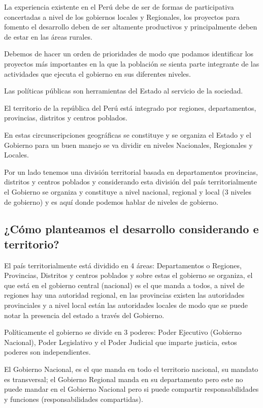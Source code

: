 \documentclass[
  jou,
  floatsintext,
  longtable,
  a4paper,
  nolmodern,
  notxfonts,
  notimes,
  12pt,
  colorlinks=true,linkcolor=blue,citecolor=blue,urlcolor=blue]{apa7}
\begin{document}
La experiencia existente en el Perú debe de ser de formas de
participativa concertadas a nivel de los gobiernos locales y Regionales,
los proyectos para fomento el desarrollo deben de ser altamente
productivos y principalmente deben de estar en las áreas rurales.

Debemos de hacer un orden de prioridades de modo que podamos identificar
los proyectos más importantes en la que la población se sienta parte
integrante de las actividades que ejecuta el gobierno en sus diferentes
niveles.

Las políticas públicas son herramientas del Estado al servicio de la
sociedad.

El territorio de la república del Perú está integrado por regiones,
departamentos, provincias, distritos y centros poblados.

En estas circunscripciones geográficas se constituye y se organiza el
Estado y el Gobierno para un buen manejo se va dividir en niveles
Nacionales, Regionales y Locales.

Por un lado tenemos una división territorial basada en departamentos
provincias, distritos y centros poblados y considerando esta división
del país territorialmente el Gobierno se organiza y constituye a nivel
nacional, regional y local (3 niveles de gobierno) y es aquí donde
podemos hablar de niveles de gobierno.

\subsection{¿Cómo planteamos el desarrollo considerando e
territorio?}\label{cuxf3mo-planteamos-el-desarrollo-considerando-e-territorio}

El país territorialmente está dividido en 4 áreas: Departamentos o
Regiones, Provincias, Distritos y centros poblados y sobre estas el
gobierno se organiza, el que está en el gobierno central (nacional) es
el que manda a todos, a nivel de regiones hay una autoridad regional, en
las provincias existen las autoridades provinciales y a nivel local
están las autoridades locales de modo que se puede notar la presencia
del estado a través del Gobierno.

Políticamente el gobierno se divide en 3 poderes: Poder Ejecutivo
(Gobierno Nacional), Poder Legislativo y el Poder Judicial que imparte
justicia, estos poderes son independientes.

El Gobierno Nacional, es el que manda en todo el territorio nacional, su
mandato es transversal; el Gobierno Regional manda en su departamento
pero este no puede mandar en el Gobierno Nacional pero si puede
compartir responsabilidades y funciones (responsabilidades compartidas).
\end{document}
